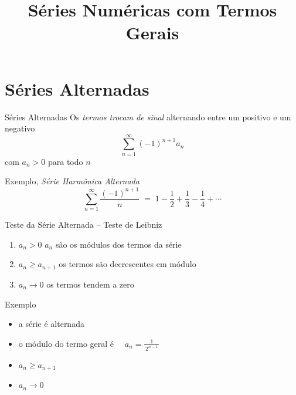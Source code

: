 \documentclass[fleqn,utf8,aspectratio=169,12pt]{beamer}
\title {Séries Numéricas com Termos Gerais}
\begin{document}
\addtitle

\section{Séries Alternadas}

\begin{frame}{Séries Alternadas}
  Os \emph{termos trocam de sinal}
  \pause
  alternando entre um positivo e um negativo
  \[ \sum_{n=1}^\infty (-1)^{n+1} a_n \]
  com $a_n >0$ para todo $n$

  \pause
  \vspace{\baselineskip}
  Exemplo, \emph{Série Harmônica Alternada}
  \[
    \sum_{n=1}^\infty \frac{(-1)^{n+1}}{n}
    \;=\; 1 - \frac{1}{2} + \frac{1}{3} - \frac{1}{4} + \cdots
  \]
\end{frame}

\begin{frame}{Teste da Série Alternada -- Teste de Leibniz}

  \vspace{0.5\baselineskip}
  \begin{enumerate}[<+->]
      \item $a_n>0$           \tabto{30mm} $a_n$ são os módulos dos termos da série  \\[2mm]
      \item $a_n\geq a_{n+1}$ \tabto{30mm} os termos são decrescentes em módulo      \\[2mm]
      \item $a_n\to 0$        \tabto{30mm} os termos tendem a zero
  \end{enumerate}

\end{frame}

\addtocounter{exemplo}{1}
\begin{frame}{Exemplo \theexemplo}
  \begin{itemize}[<+->]
    \item a série é alternada
    \item o módulo do termo geral é \(\quad a_n = \frac{1}{\,2^{n-1}\,} \)
    \item $a_n\geq a_{n+1}$
    \item $a_n\to 0$
  \end{itemize}
\end{frame}
\end{document}
